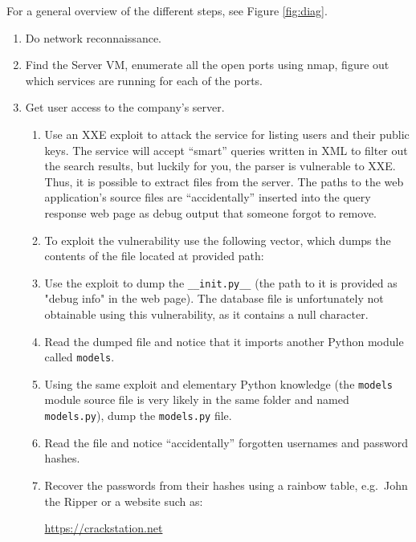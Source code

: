 \documentclass[11pt, a4paper]{article}
\begin{document}
For a general overview of the different steps, see Figure \ref{fig:diag}.

\begin{enumerate}
  \item Do network reconnaissance.
  \item Find the Server VM, enumerate all the open ports using nmap, figure
        out which services are running for each of the ports.
  \item Get user access to the company's server.
        \begin{enumerate}
          \item Use an XXE exploit to attack the service for listing users and their public keys.
            The service will accept ``smart'' queries written in XML to filter out
            the search results, but luckily for you, the parser is
            vulnerable to XXE. Thus, it is possible to extract files
            from the server. The paths to the web application's source files
            are ``accidentally'' inserted into the query response web page
            as debug output that someone forgot to remove.
          \item To exploit the vulnerability use the following vector, which
            dumps the contents of the file located at provided path:
            
          \item Use the exploit to dump the \texttt{\_\_init.py\_\_}
            (the path to it is provided as "debug info" in the web page).
            The database file is unfortunately not obtainable using this vulnerability,
            as it contains a null character.
          \item Read the dumped file and notice that it imports another
            Python module called \texttt{models}.
          \item Using the same exploit and elementary Python knowledge
            (the \texttt{models} module source file is very likely in the
            same folder and named \texttt{models.py}), dump the \texttt{models.py} file.
          \item Read the file and notice ``accidentally'' forgotten usernames
            and password hashes.
          \item Recover the passwords from their hashes using a rainbow table, e.g.~John the Ripper or
            a website such as:
            \begin{center} \url{https://crackstation.net} \end{center}
        \end{enumerate}


\end{enumerate}
\end{document}
